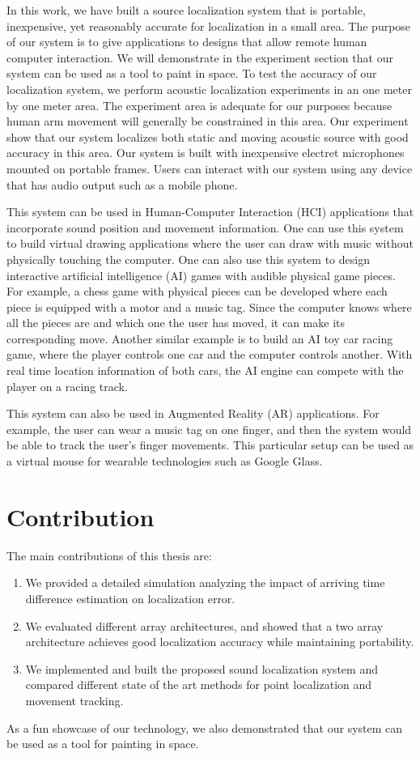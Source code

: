 In this work, we have built a source localization system that is portable, inexpensive, yet reasonably accurate for localization in a small area. The purpose of our system is to give applications to designs that allow remote human computer interaction. We will demonstrate in the experiment section that our system can be used as a tool to paint in space. To test the accuracy of our localization system, we perform acoustic localization experiments in an one meter by one meter area. The experiment area is adequate for our purposes because human arm movement will generally be constrained in this area. Our experiment show that our system localizes both static and moving acoustic source with good accuracy in this area. Our system is built with inexpensive electret microphones mounted on portable frames. Users can interact with our system using any device that has audio output such as a mobile phone.

This system can be used in Human-Computer Interaction (HCI) applications that incorporate sound position and movement information. One can use this system to build virtual drawing applications where the user can draw with music without physically touching the computer. One can also use this system to design interactive artificial intelligence (AI) games with audible physical game pieces. For example, a chess game with physical pieces can be developed where each piece is equipped with a motor and a music tag. Since the computer knows where all the pieces are and which one the user has moved, it can make its corresponding move. Another similar example is to build an AI toy car racing game, where the player controls one car and the computer controls another. With real time location information of both cars, the AI engine can compete with the player on a racing track. 

This system can also be used in Augmented Reality (AR) applications. For example, the user can wear a music tag on one finger, and then the system would be able to track the user's finger movements. This particular setup can be used as a virtual mouse for wearable technologies such as Google Glass. 


\section{Contribution}
The main contributions of this thesis are:
\begin{enumerate}
\item We provided a detailed simulation analyzing the impact of arriving time difference estimation on localization error. 
\item We evaluated different array architectures, and showed that a two array architecture achieves good localization accuracy while maintaining portability. 
\item We implemented and built the proposed sound localization system and compared different state of the art methods for point localization and movement tracking. 
\end{enumerate}
As a fun showcase of our technology, we also demonstrated that our system can be used as a tool for painting in space.

